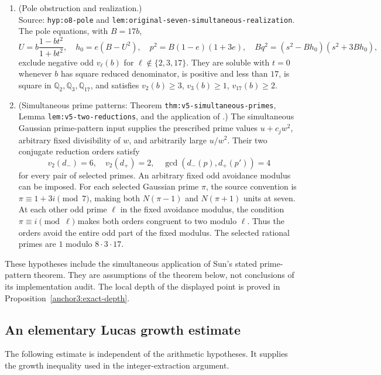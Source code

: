 \documentclass[11pt,a4paper]{article}
\theoremstyle{definition}
\theoremstyle{remark}
\begin{document}
\begin{enumerate}
\item (Pole obstruction and realization.)\\
      Source: \nolinkurl{hyp:o8-pole} and
      \nolinkurl{lem:original-seven-simultaneous-realization}.
      The pole equations, with $B=17b$,
\[
 U=b\frac{1-bt^2}{1+bt^2},\quad h_0=e(B-U^2),\quad
 p^2=B(1-e)(1+3e),\quad
 Bq^2=(s^2-Bh_0)(s^2+3Bh_0),
\]
      exclude negative odd $v_\ell(b)$ for $\ell\notin\{2,3,17\}$.
      They are soluble with $t=0$ whenever $b$ has square reduced
      denominator, is positive and less than $17$, is square in
      $\mathbb Q_2,\mathbb Q_3,\mathbb Q_{17}$, and satisfies
      $v_2(b)\ge3$, $v_3(b)\ge1$, $v_{17}(b)\ge2$.
\item (Simultaneous prime patterns: Theorem \nolinkurl{thm:v5-simultaneous-primes},
      Lemma \nolinkurl{lem:v5-two-reductions}, and the application of
      \cite[Theorem 4.1]{Sun2026Rational86}.)
      The simultaneous Gaussian prime-pattern input supplies the
      prescribed prime values $u+c_jw^2$, arbitrary fixed divisibility
      of $w$, and arbitrarily large $u/w^2$.  Their two conjugate
      reduction orders satisfy
\[
 v_2(d_-)=6,\quad v_2(d_+)=2,\quad
 \gcd(d_-(p),d_+(p'))=4
\]
      for every pair of selected primes.  An arbitrary fixed odd
      avoidance modulus can be imposed.  For each selected Gaussian
      prime $\pi$, the source convention is
      $\pi\equiv1+3i\pmod7$, making both $N(\pi-1)$ and
      $N(\pi+1)$ units at seven.  At each other odd prime $\ell$
      in the fixed avoidance modulus, the condition
      $\pi\equiv i\pmod\ell$ makes both orders congruent to two
      modulo $\ell$.  Thus the orders avoid the entire odd part
      of the fixed modulus.  The selected rational primes are $1$
      modulo $8\cdot3\cdot17$.
\end{enumerate}
These hypotheses include the simultaneous application of Sun's stated
prime-pattern theorem.  They are assumptions of the theorem below,
not conclusions of its implementation audit.
The local depth of the displayed point is proved in Proposition~\ref{anchor3:exact-depth}.

\subsection{An elementary Lucas growth estimate}

The following estimate is independent of the arithmetic hypotheses.
It supplies the growth inequality used in the integer-extraction argument.
\end{document}
